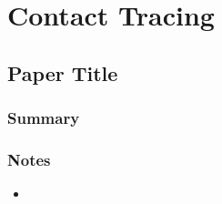 \section{Contact Tracing}
\subsection{Paper Title}
\subsubsection*{Summary}
\subsubsection*{Notes}
\begin{itemize}
\item
\end{itemize}